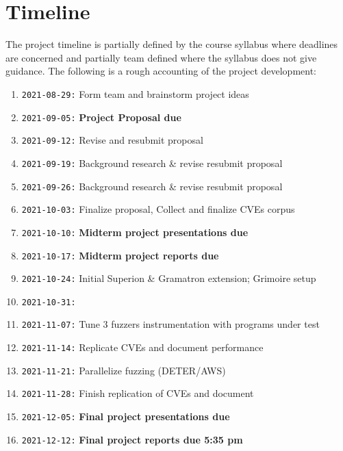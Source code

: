 \documentclass[12pt]{diazessay}
\begin{document}
\section*{Timeline}

The project timeline is partially defined by the course syllabus where deadlines are concerned and partially team defined where the syllabus does not give guidance.
The following is a rough accounting of the project development:

\begin{enumerate}[label={}]
	\item \texttt{2021-08-29:} Form team and brainstorm project ideas
	\item \texttt{2021-09-05:} \textbf{Project Proposal due}
	\item \texttt{2021-09-12:} Revise and resubmit proposal
	\item \texttt{2021-09-19:} Background research \& revise \/ resubmit proposal
	\item \texttt{2021-09-26:} Background research \& revise \/ resubmit proposal
	\item \texttt{2021-10-03:} Finalize proposal, Collect and finalize CVEs corpus
	\item \texttt{2021-10-10:} \textbf{Midterm project presentations due}
	\item \texttt{2021-10-17:} \textbf{Midterm project reports due}
	\item \texttt{2021-10-24:} Initial Superion \& Gramatron extension; Grimoire setup
	\item \texttt{2021-10-31:} 
	\item \texttt{2021-11-07:} Tune 3 fuzzers instrumentation with programs under test
	\item \texttt{2021-11-14:} Replicate CVEs and document performance
	\item \texttt{2021-11-21:} Parallelize fuzzing \hfill (DETER/AWS)
	\item \texttt{2021-11-28:} Finish replication of CVEs and document
	\item \texttt{2021-12-05:} \textbf{Final project presentations due}
	\item \texttt{2021-12-12:} \textbf{Final project reports due 5:35 pm}
\end{enumerate}


\clearpage
\end{document}
